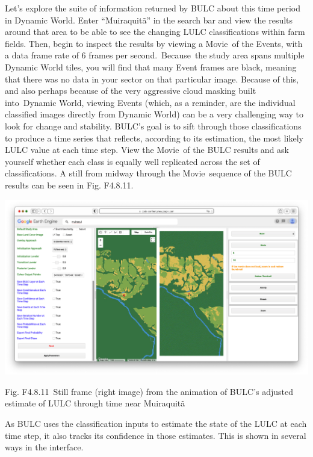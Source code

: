\documentclass[
  letterpaper,
  DIV=11,
  numbers=noendperiod]{scrreprt}
\begin{document}
Let's explore the suite of information returned by BULC about this time
period in Dynamic World. Enter ``Muiraquitã'' in the search bar and view
the results around that area to be able to see the changing LULC
classifications within farm fields. Then, begin to inspect the results
by viewing a Movie~of the Events, with a data frame rate of 6 frames per
second.~Because~the study area spans multiple Dynamic World tiles, you
will find that many Event frames are black, meaning that there was no
data in your sector on that particular image. Because of this, and also
perhaps because of the very aggressive cloud masking built into~Dynamic
World, viewing Events (which, as a reminder, are the individual
classified images directly from Dynamic World) can be a very challenging
way to look for change and stability. BULC's goal is to sift through
those classifications to produce a time series that reflects, according
to its estimation, the most likely LULC value at each time step. View
the Movie~of the BULC results and ask yourself whether each class is
equally well replicated across the set of classifications. A still from
midway through the Movie~sequence of the BULC results can be seen in
Fig. F4.8.11.

\includegraphics{./F4/image13.png}

Fig. F4.8.11~Still frame (right image) from the animation of BULC's
adjusted estimate of LULC through time near Muiraquitã

As BULC uses the classification inputs to estimate the state of the LULC
at each time step, it also tracks its confidence in those estimates.
This is shown in several ways in the interface.
\end{document}
